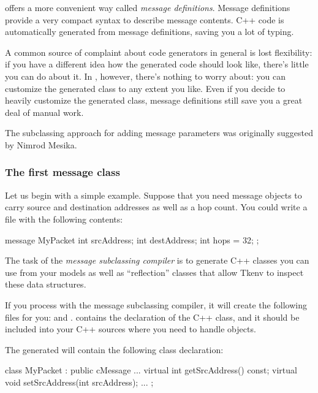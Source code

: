 {\opp} offers a more convenient way called \textit{message definitions}.
Message definitions provide a very compact syntax to describe
message contents. C++ code is automatically generated from message
definitions, saving you a lot of typing.

A common source of complaint about code generators in general is
lost flexibility: if you have a different idea how the generated
code should look like, there's little you can do about it.
In {\opp}, however, there's nothing to worry about: you can
customize the generated class to any extent you like.
Even if you decide to heavily customize the generated class,
message definitions still save you a great deal of manual work.

The subclassing approach for adding message parameters was originally
suggested by Nimrod Mesika.


\subsubsection{The first message class}

Let us begin with a simple example. Suppose that you need message objects to
carry source and destination addresses as well as a hop count. You could write
a  file with the following contents:

\begin{msg}
message MyPacket
{
     int srcAddress;
     int destAddress;
     int hops = 32;
};
\end{msg}

The task of the \textit{message subclassing compiler} is to generate C++ classes
you can use from your models as well as ``reflection'' classes that allow
Tkenv to inspect these data structures.

If you process  with the message subclassing compiler, it will
create the following files for you:  and .
 contains the declaration of the  C++ class, and
it should be included into your C++ sources where you need to handle
 objects.

The generated  will contain the following class declaration:

\begin{cpp}
class MyPacket : public cMessage {
    ...
    virtual int getSrcAddress() const;
    virtual void setSrcAddress(int srcAddress);
    ...
};
\end{cpp}

